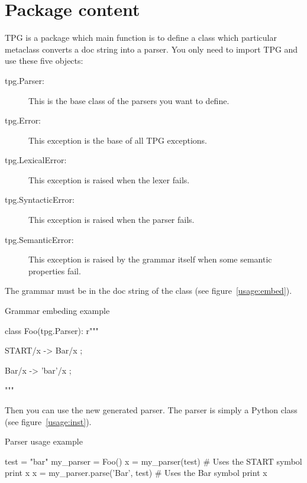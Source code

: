 \section{Package content}

TPG is a package which main function is to define a class which particular metaclass converts a doc string into a parser.
You only need to import TPG and use these five objects:

\begin{description}
    \item [tpg.Parser:]
        This is the base class of the parsers you want to define.
    \item [tpg.Error:]
        This exception is the base of all TPG exceptions.
    \item [tpg.LexicalError:]
        This exception is raised when the lexer fails.
    \item [tpg.SyntacticError:]
        This exception is raised when the parser fails.
    \item [tpg.SemanticError:]
        This exception is raised by the grammar itself
        when some semantic properties fail.
\end{description}

The grammar must be in the doc string of the class (see figure~\ref{usage:embed}).

\begin{code}
\caption{Grammar embeding example}                          \label{usage:embed}
\begin{verbatimtab}[4]
    class Foo(tpg.Parser):
        r"""

        START/x -> Bar/x ;

        Bar/x -> 'bar'/x ;

        """
\end{verbatimtab}
\end{code}

Then you can use the new generated parser. The parser is simply a Python class (see figure~\ref{usage:inst}).

\begin{code}
\caption{Parser usage example}                              \label{usage:inst}
\begin{verbatimtab}[4]
    test = "bar"
    my_parser = Foo()
    x = my_parser(test)               # Uses the START symbol
    print x
    x = my_parser.parse('Bar', test)  # Uses the Bar symbol
    print x
\end{verbatimtab}
\end{code}

